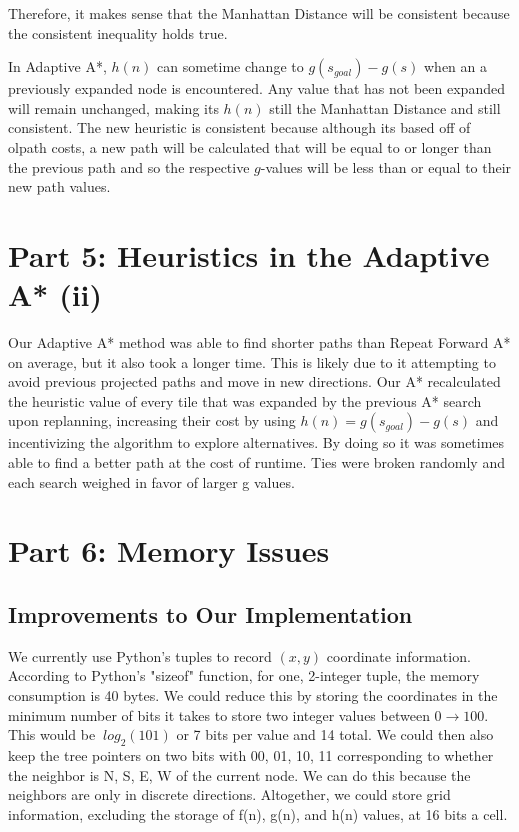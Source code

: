 \documentclass[a4paper,12pt]{article}
\begin{document}
Therefore, it makes sense that the Manhattan Distance will be consistent because the consistent inequality holds true. 

In Adaptive A*, $h(n)$ can sometime change to $g(s_{goal}) - g(s)$ when an a previously expanded node is encountered. Any value that has not been expanded will remain unchanged, making its $h(n)$ still the Manhattan Distance and still consistent. The new heuristic is consistent because although its based off of olpath costs, a new path will be calculated that will be equal to or longer than the previous path and so the respective $g$-values will be less than or equal to their new path values. 

\section{Part 5:  Heuristics in the Adaptive A* (ii)}
Our Adaptive A* method was able to find shorter paths than Repeat Forward A* on average, but it also took a longer time. This is likely due to it attempting to avoid previous projected paths and move in new directions. Our A* recalculated the heuristic value of every tile that was expanded by the previous A* search upon replanning, increasing their cost by using $h(n) = g(s_{goal}) - g(s)$ and incentivizing the algorithm to explore alternatives.  By doing so it was sometimes able to find a better path at the cost of runtime. Ties were broken randomly and each search weighed in favor of larger g values.

\section{Part 6: Memory Issues}

\subsection{Improvements to Our Implementation}
We currently use Python's tuples to record $(x , y)$ coordinate information. According to Python's "sizeof" function, for one, 2-integer tuple, the memory consumption is 40 bytes. We could reduce this by storing the coordinates in the minimum number of bits it takes to store two integer values between $0 \rightarrow 100$. This would be $~log_{2}(101)$ or 7 bits per value and 14 total. We could then also keep the tree pointers on two bits with 00, 01, 10, 11 corresponding to whether the neighbor is N, S, E, W of the current node. We can do this because the neighbors are only in discrete directions. Altogether, we could store grid information, excluding the storage of f(n), g(n), and h(n) values, at 16 bits a cell. 
\end{document}
